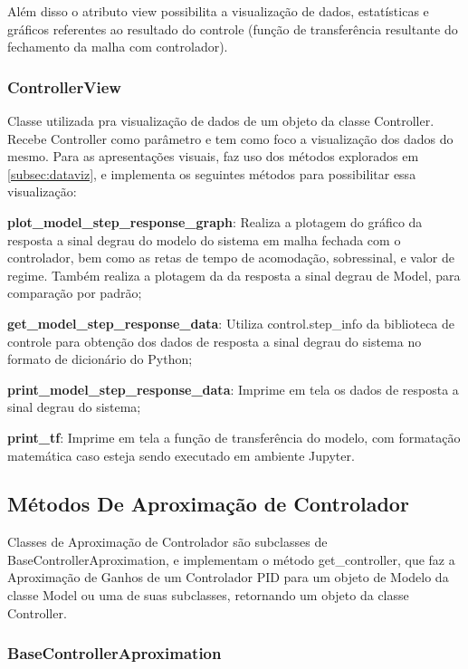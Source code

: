 Além disso o atributo view possibilita a visualização de dados, estatísticas e gráficos referentes ao resultado do
controle (função de transferência resultante do fechamento da malha com controlador).

\subsubsection{ControllerView}\label{subsubsec:devControllerView}

Classe utilizada pra visualização de dados de um objeto da classe Controller.
Recebe Controller como parâmetro e tem como foco a visualização dos dados do mesmo.
Para as apresentações visuais, faz uso dos métodos explorados em \ref{subsec:dataviz}, e implementa os seguintes
métodos para possibilitar essa visualização:
\begin{alineas}
    \item \textbf{plot\_model\_step\_response\_graph}: Realiza a plotagem do gráfico da resposta a sinal degrau do
    modelo do sistema em malha fechada com o controlador, bem como as retas de tempo de acomodação, sobressinal, e valor
    de regime.
    Também realiza a plotagem da da resposta a sinal degrau de Model, para comparação por padrão;
    \item \textbf{get\_model\_step\_response\_data}: Utiliza control.step\_info da biblioteca de controle para
    obtenção dos dados de resposta a sinal degrau do sistema no formato de dicionário do Python;
    \item \textbf{print\_model\_step\_response\_data}: Imprime em tela os dados de resposta a sinal degrau do sistema;
    \item \textbf{print\_tf}: Imprime em tela a função de transferência do modelo, com formatação matemática caso
    esteja sendo executado em ambiente Jupyter.
\end{alineas}

\subsection{Métodos De Aproximação de Controlador}

Classes de Aproximação de Controlador são subclasses de BaseControllerAproximation, e implementam o método
get\_controller, que faz a Aproximação de Ganhos de um Controlador PID para um objeto de Modelo da classe Model ou
uma de suas subclasses, retornando um objeto da classe Controller.

\subsubsection{BaseControllerAproximation}\label{subsubsec:devBaseControllerAproximation}


